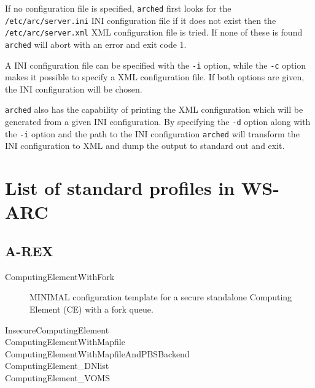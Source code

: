\documentclass{article}
\begin{document}
If no configuration file is specified, \texttt{arched} first looks for the
\texttt{/etc/arc/server.ini} INI configuration file if it does not exist then
the \texttt{/etc/arc/server.xml} XML configuration file is tried. If none of
these is found \texttt{arched} will abort with an error and exit code 1.

A INI configuration file can be specified with the \texttt{-i} option,  while
the \texttt{-c} option makes it possible to specify a XML configuration file. If
both options are given, the INI configuration will be chosen.

\texttt{arched} also has the capability of printing the XML configuration which
will be generated from a given INI configuration. By specifying the \texttt{-d}
option along with the \texttt{-i} option and the path to the INI configuration
\texttt{arched} will transform the INI configuration to XML and dump the output
to standard out and exit.

\appendix
\section{List of standard profiles in WS-ARC}\label{app:List of profiles}


\subsection{A-REX}
\begin{description}
\item[ComputingElementWithFork] MINIMAL configuration template for a secure
standalone Computing Element (CE) with a fork queue.
\item[InsecureComputingElement]
\item[ComputingElementWithMapfile]
\item[ComputingElementWithMapfileAndPBSBackend]
\item[ComputingElement\_DNlist]
\item[ComputingElement\_VOMS]
\end{description}
\end{document}
